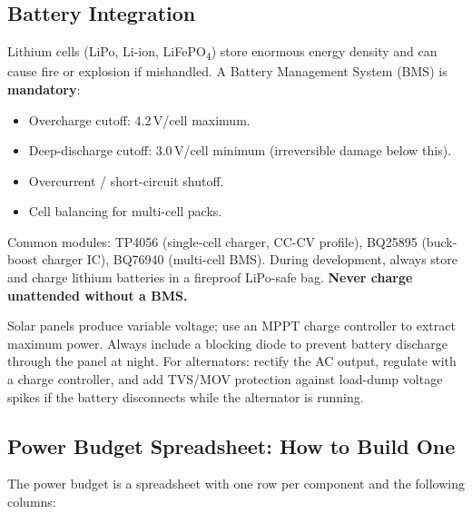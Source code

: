 \subsection{Battery Integration}
\label{sec:battery}

Lithium cells (LiPo, Li-ion, LiFePO\textsubscript{4}) store enormous energy density and can cause fire or explosion if mishandled. A Battery Management System (BMS) is \textbf{mandatory}:

\begin{itemize}[nosep,leftmargin=1.5em]
  \item Overcharge cutoff: 4.2\,V/cell maximum.
  \item Deep-discharge cutoff: 3.0\,V/cell minimum (irreversible damage below this).
  \item Overcurrent / short-circuit shutoff.
  \item Cell balancing for multi-cell packs.
\end{itemize}

Common modules: TP4056 (single-cell charger, CC-CV profile), BQ25895 (buck-boost charger IC), BQ76940 (multi-cell BMS). During development, always store and charge lithium batteries in a fireproof LiPo-safe bag. \textbf{Never charge unattended without a BMS.}

\begin{tipbox}
Solar panels produce variable voltage; use an MPPT charge controller to extract maximum power. Always include a blocking diode to prevent battery discharge through the panel at night. For alternators: rectify the AC output, regulate with a charge controller, and add TVS/MOV protection against load-dump voltage spikes if the battery disconnects while the alternator is running.
\end{tipbox}



\subsection{Power Budget Spreadsheet: How to Build One}
The power budget is a spreadsheet with one row per component and the following columns:

